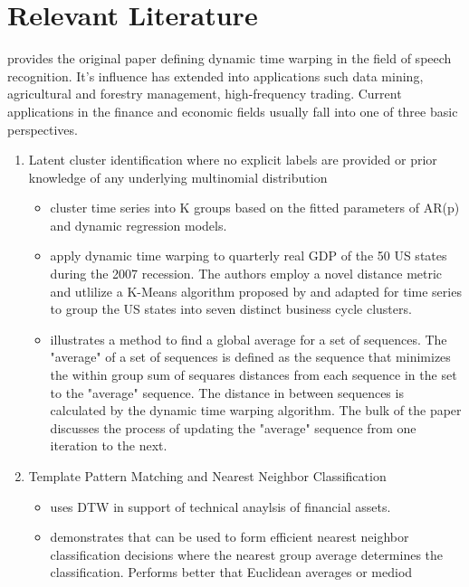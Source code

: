 \documentclass[12pt]{article}
\begin{document}
\section{Relevant Literature}

\cite{SakoeChiba_IEEE_1978} provides the original paper defining dynamic time warping in the field of speech recognition. It's influence has extended into applications such data mining, agricultural and forestry management, high-frequency trading.
Current applications in the finance and economic fields usually fall into one of three basic perspectives. 
\begin{enumerate}
    \item Latent cluster identification where no explicit labels are provided or prior knowledge of any underlying multinomial distribution
    \begin{itemize}
        \item \parencite{FruhwirthKaufmann2004} cluster time series into K groups based on the fitted parameters of AR(p) and dynamic regression models.
        \item \parencite{FrancesWiemann2020} apply dynamic time warping to quarterly real GDP of the 50 US states during the 2007 recession. The authors employ a novel distance metric and utlilize a K-Means algorithm proposed by \cite{PETITJEAN2011678} and adapted for time series to group the US states into seven distinct business cycle clusters.
        \item \cite{PETITJEAN2011678} illustrates a method to find a global average for a set of sequences. The "average" of a set of sequences is defined as the sequence that minimizes the within group sum of sequares distances from each sequence in the set to the "average" sequence. The distance in between sequences is calculated by the dynamic time warping algorithm. The bulk of the paper discusses the process of updating the "average" sequence from one iteration to the next. 
    \end{itemize}
    \item Template Pattern Matching and Nearest Neighbor Classification
    \begin{itemize}
        \item \cite{WAN2017151} uses DTW in support of technical anaylsis of financial assets.
        \item \cite{Petitjean_et_al_2016} demonstrates that \cite{PETITJEAN2011678} can be used to form efficient nearest neighbor classification decisions where the nearest group average determines the classification. Performs better that Euclidean averages or mediod 

\end{itemize}
\end{enumerate}
\end{document}
